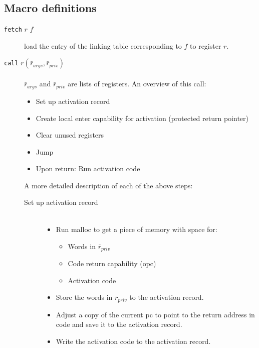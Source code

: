 \documentclass[a4paper]{article}
\newcommand{\forcenewline}{$\phantom{v}$\\}
\newcommand{\var}[1]{\mathit{#1}}
\begin{document}
              \subsection{Macro definitions}
              \begin{description}
              \item[\texttt{fetch} $r$ $f$] load the entry of the linking table corresponding to $f$ to register $r$.
              \item[\texttt{call} $r(\bar{r}_{\var{args}},\bar{r}_{\var{priv}})$] \forcenewline
                $\bar{r}_{\var{args}}$ and $\bar{r}_{\var{priv}}$ are lists of registers. An overview of this call:
                \begin{itemize}
                \item Set up activation record
                \item Create local enter capability for activation (protected return pointer)
                \item Clear unused registers
                \item Jump
                \item Upon return: Run activation code
                \end{itemize}
                A more detailed description of each of the above steps:
                \begin{description}
                \item [Set up activation record]\forcenewline
                  \begin{itemize}
                  \item Run malloc to get a piece of memory with space for:
                    \begin{itemize}
                    \item Words in $\bar{r}_{\var{priv}}$
                    \item Code return capability (opc)
                    \item Activation code
                    \end{itemize}
                  \item Store the words in $\bar{r}_{\var{priv}}$ to the activation record. 
                  \item Adjust a copy of the current pc to point to the return address in code and save it to the activation record.
                  \item Write the activation code to the activation record.
                  \end{itemize}

\end{description}
\end{description}
\end{document}
